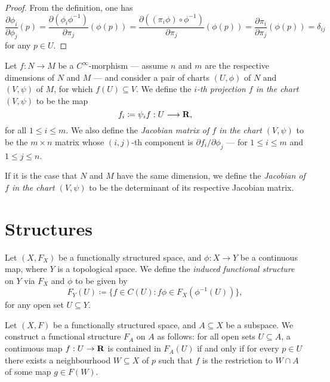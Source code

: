 \begin{proof}
From the definition, one has
\[
\frac{\partial \phi_{i}}{\partial \phi_j} (p)
= \frac{\partial (\phi_{i} \phi^{-1})}{\partial \pi_j} (\phi(p))
= \frac{\partial ((\pi_i \phi) \circ \phi^{-1})}{\partial \pi_j} (\phi(p))
= \frac{\partial \pi_i}{\partial \pi_j} (\phi(p))
= \delta_{i j}
\]
for any \(p \in U\).
\end{proof}

\begin{definition}[Jacobian]
\label{def:}
Let \(f: N \to M\) be a \(C^{\infty}\)-morphism --- assume \(n\) and \(m\) are
the respective dimensions of \(N\) and \(M\) --- and consider a pair of charts
\((U, \phi)\) of \(N\) and \((V, \psi)\) of \(M\), for which
\(f(U) \subseteq V\). We define the \emph{\(i\)-th projection \(f\) in the chart
  \((V, \psi)\)} to be the map
\[
f_i \coloneq \psi_i f: U \longrightarrow \mathbf{R},
\]
for all \(1 \leq i \leq m\).  We also define the \emph{Jacobian matrix of \(f\)
  in the chart \((V, \psi)\)} to be the \(m \times n\) matrix whose
\((i, j)\)-th component is \(\partial f_i/\partial \phi_j\) --- for
\(1 \leq i \leq m\) and \(1 \leq j \leq n\).

If it is the case that \(N\) and \(M\) have the same dimension, we define the
\emph{Jacobian of \(f\) in the chart \((V, \psi)\)} to be the determinant of its
respective Jacobian matrix.
\end{definition}

\section{Structures}

\begin{definition}
\label{def:induced-functional-structure-space}
Let \((X, F_X)\) be a functionally structured space, and \(\phi: X \to Y\) be a
continuous map, where \(Y\) is a topological space. We define the \emph{induced
  functional structure} on \(Y\) via \(F_X\) and \(\phi\) to be given by
\[
F_Y(U) \coloneq \{f \in C(U) \colon f \phi \in F_X(\phi^{-1}(U))\},
\]
for any open set \(U \subseteq Y\).
\end{definition}

\begin{definition}
\label{def:induced-func-struc-on-subspace}
Let \((X, F)\) be a functionally structured space, and \(A \subseteq X\) be a
subspace. We construct a functional structure \(F_A\) on \(A\) as follows: for
all open sets \(U \subseteq A\), a continuous map \(f: U \to \mathbf{R}\) is contained
in \(F_A(U)\) if and only if for every \(p \in U\) there exists a neighbourhood
\(W \subseteq X\) of \(p\) such that \(f\) is the restriction to \(W \cap A\) of
some map \(g \in F(W)\).
\end{definition}

